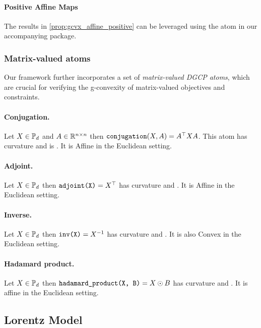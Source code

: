 \documentclass[twoside,11pt]{article}
\begin{document}
\paragraph{Positive Affine Maps}

The results in \ref{prop:gcvx_affine_positive} can be leveraged using the  atom in our accompanying package.

\subsubsection{Matrix-valued atoms}
Our framework further incorporates a set of \emph{matrix-valued DGCP atoms}, which are crucial for verifying the g-convexity of matrix-valued objectives and constraints.

\paragraph{Conjugation.} Let $X \in \mathbb{P}_d$ and $A \in \mathbb{R}^{n \times n}$ then $\texttt{conjugation}(X, A) = A^\top X A$.
This atom has  curvature and is . It is Affine in the Euclidean setting.

\paragraph{Adjoint.} Let $X \in \mathbb{P}_d$ then $\texttt{adjoint(X)} = X^\top$ has  curvature and . It is Affine in the Euclidean setting.

\paragraph{Inverse.} Let $X \in \mathbb{P}_d$ then $\texttt{inv(X)} = X^{-1}$ has  curvature and . It is also Convex in the Euclidean setting.

\paragraph{Hadamard product.} Let $X \in \mathbb{P}_d$ then $\texttt{hadamard\_product(X, B)} = X \odot B$ has  curvature and . It is affine in the Euclidean setting.


\subsection{Lorentz Model}\label{sec:Lorentz_model}
\end{document}
